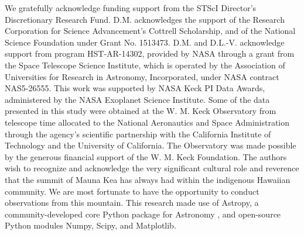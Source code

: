 \documentclass[preprint2]{aastex6}
\begin{document}


% 





%
%
\vspace{-0.3cm} %
\acknowledgements

\noindent We gratefully acknowledge funding support from the STScI Director's Discretionary Research Fund. D.M. acknowledges the support of the Research Corporation for Science Advancement's Cottrell Scholarship, and of the National Science Foundation under Grant No. 1513473. D.M. and D.L.-V. acknowledge support from program HST-AR-14302, provided by NASA through a grant from the Space Telescope Science Institute, which is operated by the Association of Universities for Research in Astronomy, Incorporated, under NASA contract NAS5-26555. This work was supported by NASA Keck PI Data Awards, administered by the NASA Exoplanet Science Institute. Some of the data presented in this study were obtained at the W. M. Keck Observatory from telescope time allocated to the National Aeronautics and Space Administration through the agency's scientific partnership with the California Institute of Technology and the University of California. The Observatory was made possible by the generous financial support of the W. M. Keck Foundation. The authors wish to recognize and acknowledge the very significant cultural role and reverence that the summit of Mauna Kea has always had within the indigenous Hawaiian community. We are most fortunate to have the opportunity to conduct observations from this mountain. This research made use of Astropy, a community-developed core Python package for Astronomy \citep{astropy}, and open-source Python modules Numpy, Scipy, and Matplotlib. 
\end{document}
